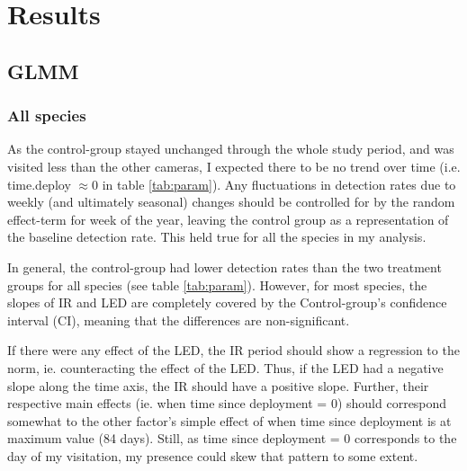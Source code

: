 \chapter{Results}
%
%
%





\section{GLMM}


\subsection{All species}

As the control-group stayed unchanged through the whole study period, and was visited less than the other cameras, I expected there to be no trend over time (i.e. time.deploy $\approx 0$ in table \ref{tab:param}).
Any fluctuations in detection rates due to weekly (and ultimately seasonal) changes should be controlled for by the random effect-term for week of the year, leaving the control group as a representation of the baseline detection rate.
This held true for all the species in my analysis.

In general, the control-group had lower detection rates than the two treatment groups for all species (see table \ref{tab:param}).
However, for most species, the slopes of IR and LED are completely covered by the Control-group's confidence interval (CI), meaning that the differences are non-significant.


If there were any effect of the LED, the IR period should show a regression to the norm, ie. counteracting the effect of the LED.
Thus, if the LED had a negative slope along the time axis, the IR should have a positive slope.
Further, their respective main effects (ie. when time since deployment = 0) should correspond somewhat to the other factor's simple effect of when time since deployment is at maximum value (84 days).
Still, as time since deployment = 0 corresponds to the day of my visitation, my presence could skew that pattern to some extent.

